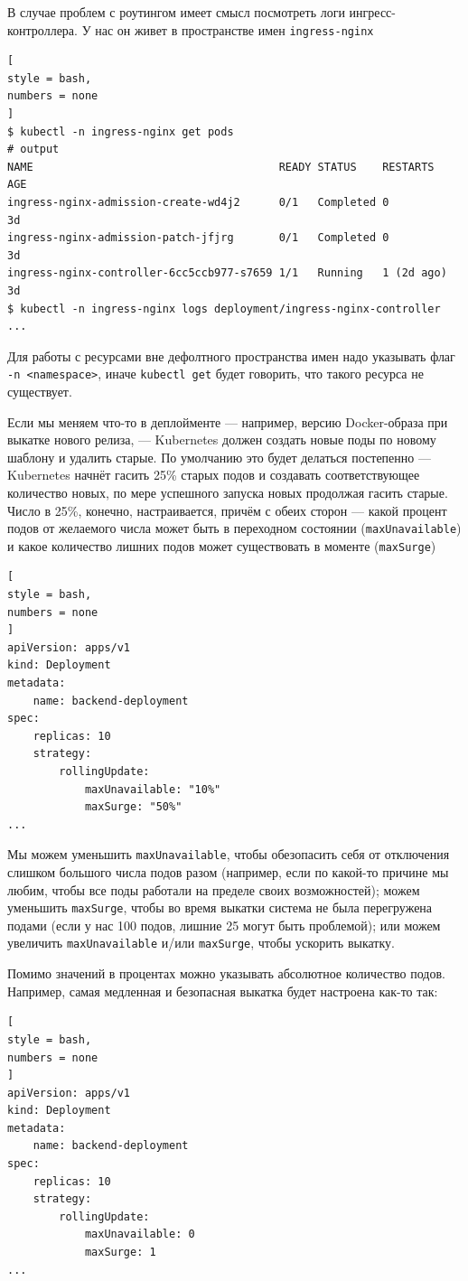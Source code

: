 \documentclass[%
	11pt,
	a4paper,
	utf8,
		]{article}
\begin{document}
В случае проблем с роутингом имеет смысл посмотреть логи ингресс-контроллера. У нас он живет в пространстве имен \verb*|ingress-nginx|
\begin{lstlisting}[
style = bash,
numbers = none
]
$ kubectl -n ingress-nginx get pods
# output
NAME                                      READY STATUS    RESTARTS   AGE
ingress-nginx-admission-create-wd4j2      0/1   Completed 0          3d
ingress-nginx-admission-patch-jfjrg       0/1   Completed 0          3d
ingress-nginx-controller-6cc5ccb977-s7659 1/1   Running   1 (2d ago) 3d
$ kubectl -n ingress-nginx logs deployment/ingress-nginx-controller
...
\end{lstlisting}

Для работы с ресурсами вне дефолтного пространства имен надо указывать флаг \verb*|-n <namespace>|, иначе \verb|kubectl get| будет говорить, что такого ресурса не существует.

Если мы меняем что-то в деплойменте — например, версию Docker-образа при выкатке нового релиза, — Kubernetes должен создать новые поды по новому шаблону и удалить старые. По умолчанию это будет делаться постепенно — Kubernetes начнёт гасить 25\% старых подов и создавать соответствующее количество новых, по мере успешного запуска новых продолжая гасить старые. Число в 25\%, конечно, настраивается, причём с обеих сторон — какой процент подов от желаемого числа может быть в переходном состоянии (\verb*|maxUnavailable|) и какое количество лишних подов может существовать в моменте (\verb*|maxSurge|)
\begin{lstlisting}[
style = bash,
numbers = none
]
apiVersion: apps/v1
kind: Deployment
metadata:
	name: backend-deployment
spec:
	replicas: 10
	strategy:
		rollingUpdate:
			maxUnavailable: "10%"
			maxSurge: "50%"
...
\end{lstlisting}

Мы можем уменьшить \verb|maxUnavailable|, чтобы обезопасить себя от отключения слишком большого числа подов разом (например, если по какой-то причине мы любим, чтобы все поды работали на пределе своих возможностей); можем уменьшить \verb*|maxSurge|, чтобы во время выкатки система не была перегружена подами (если у нас 100 подов, лишние 25 могут быть проблемой); или можем увеличить \verb*|maxUnavailable| и/или \verb*|maxSurge|, чтобы ускорить выкатку.

Помимо значений в процентах можно указывать абсолютное количество подов. Например, самая медленная и безопасная выкатка будет настроена как-то так:
\begin{lstlisting}[
style = bash,
numbers = none
]
apiVersion: apps/v1
kind: Deployment
metadata:
	name: backend-deployment
spec:
	replicas: 10
	strategy:
		rollingUpdate:
			maxUnavailable: 0
			maxSurge: 1
...
\end{lstlisting}
\end{document}
